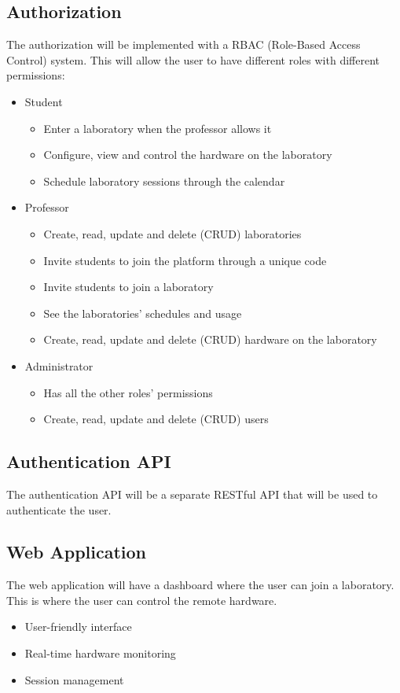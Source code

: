 \documentclass[a4paper,twoside,11pt]{article}
\begin{document}
\subsection*{Authorization}
The authorization will be implemented with a RBAC (Role-Based Access Control) system.
This will allow the user to have different roles with different permissions:
\begin{itemize}
    \item Student
	\begin{itemize}
		\item Enter a laboratory when the professor allows it
		\item Configure, view and control the hardware on the laboratory
		\item Schedule laboratory sessions through the calendar
	\end{itemize}
	\item Professor
	\begin{itemize}
		\item Create, read, update and delete (CRUD) laboratories
		\item Invite students to join the platform through a unique code
		\item Invite students to join a laboratory
		\item See the laboratories' schedules and usage
		\item Create, read, update and delete (CRUD) hardware on the laboratory
	\end{itemize}
	\item Administrator
	\begin{itemize}
		\item Has all the other roles' permissions
		\item Create, read, update and delete (CRUD) users
	\end{itemize}
\end{itemize}

\subsection*{Authentication API}
The authentication API will be a separate RESTful API that will be used to authenticate the user.

\subsection*{Web Application}
The web application will have a dashboard where the user can join a laboratory.
This is where the user can control the remote hardware.
\begin{itemize}
    \item User-friendly interface
    \item Real-time hardware monitoring
    \item Session management
\end{itemize}
\end{document}
